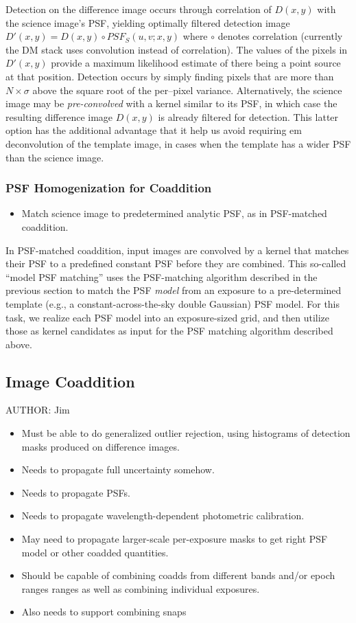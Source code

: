 Detection on the difference image occurs through correlation of $D(x,y)$ with the science image's PSF, yielding optimally filtered detection image $D'(x,y) = D(x,y) \circ PSF_S(u,v;x,y)$ where $\circ$ denotes correlation (currently the DM stack uses convolution instead of correlation). The values of the pixels in $D'(x,y)$ provide a maximum likelihood estimate of there being a point source at that position. Detection occurs by simply finding pixels that are more than $N \times \sigma$ above the square root of the per--pixel variance. Alternatively, the science image may be {\em pre-convolved} with a kernel similar to its PSF, in which case the resulting difference image $D(x,y)$ is already filtered for detection. This latter option has the additional advantage that it help us avoid requiring {em deconvolution} of the template image, in cases when the template has a wider PSF than the science image. 

\subsubsection{PSF Homogenization for Coaddition}
\label{sec:acPSFHomogenization}
\begin{itemize}
\item Match science image to predetermined analytic PSF, as in PSF-matched coaddition.
\end{itemize}

In PSF-matched coaddition, input images are convolved by a kernel that matches their PSF to a predefined constant PSF before they are combined. This so-called ``model PSF matching'' uses the PSF-matching algorithm described in the previous section to match the PSF {\em   model} from an exposure to a pre-determined template (e.g., a constant-across-the-sky double Gaussian) PSF model. For this task, we realize each PSF model into an exposure-sized grid, and then utilize those as kernel candidates as input for the PSF matching algorithm described above. 

\subsection{Image Coaddition}
\label{sec:acCoaddition}
AUTHOR: Jim
\begin{itemize}
\item Must be able to do generalized outlier rejection, using histograms of detection masks produced on difference images.
\item Needs to propagate full uncertainty somehow.
\item Needs to propagate PSFs.
\item Needs to propagate wavelength-dependent photometric calibration.
\item May need to propagate larger-scale per-exposure masks to get right PSF model or other coadded quantities.
\item Should be capable of combining coadds from different bands and/or epoch ranges ranges as well as combining individual exposures.
\item Also needs to support combining snaps
\end{itemize}

